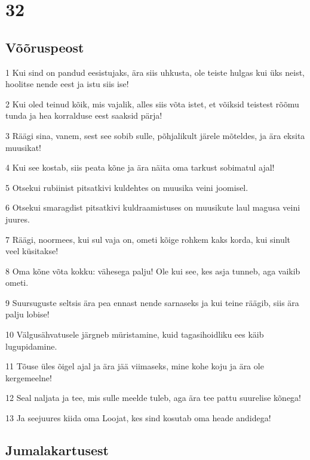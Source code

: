 \chapter{32}

\section*{Võõruspeost}

\par 1 Kui sind on pandud eesistujaks, ära siis uhkusta, ole teiste hulgas kui üks neist, hoolitse nende eest ja istu siis ise!
\par 2 Kui oled teinud kõik, mis vajalik, alles siis võta istet, et võiksid teistest rõõmu tunda ja hea korralduse eest saaksid pärja!
\par 3 Räägi sina, vanem, sest see sobib sulle, põhjalikult järele mõteldes, ja ära eksita muusikat!
\par 4 Kui see kostab, siis peata kõne ja ära näita oma tarkust sobimatul ajal!
\par 5 Otsekui rubiinist pitsatkivi kuldehtes on muusika veini joomisel.
\par 6 Otsekui smaragdist pitsatkivi kuldraamistuses on muusikute laul magusa veini juures.
\par 7 Räägi, noormees, kui sul vaja on, ometi kõige rohkem kaks korda, kui sinult veel küsitakse!
\par 8 Oma kõne võta kokku: vähesega palju! Ole kui see, kes asja tunneb, aga vaikib ometi.
\par 9 Suursuguste seltsis ära pea ennast nende sarnaseks ja kui teine räägib, siis ära palju lobise!
\par 10 Välgusähvatusele järgneb müristamine, kuid tagasihoidliku ees käib lugupidamine.
\par 11 Tõuse üles õigel ajal ja ära jää viimaseks, mine kohe koju ja ära ole kergemeelne!
\par 12 Seal naljata ja tee, mis sulle meelde tuleb, aga ära tee pattu suurelise kõnega!
\par 13 Ja seejuures kiida oma Loojat, kes sind kosutab oma heade andidega!

\section*{Jumalakartusest}

